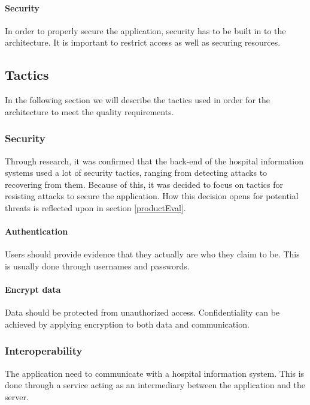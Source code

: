 \paragraph*{Security}
In order to properly secure the application, security has to be built in to the architecture. It is important to restrict access as well as securing resources.



\newpage

\subsection{Tactics}
In the following section we will describe the tactics used in order for the architecture to meet the quality requirements.

\subsubsection{Security}
\label{architecturesecurity}
Through research, it was confirmed that the back-end of the hospital information systems used a lot of security tactics, ranging from detecting attacks to recovering from them. Because of this, it was decided to focus on tactics for resisting attacks to secure the application. How this decision opens for potential threats is reflected upon in section \ref{productEval}.

\paragraph*{Authentication}
Users should provide evidence that they actually are who they claim to be. This is usually done through usernames and passwords.

\paragraph*{Encrypt data}
Data should be protected from unauthorized access. Confidentiality can be achieved by applying encryption to both data and communication.

\subsubsection{Interoperability}
The application need to communicate with a hospital information system. This is done through a service acting as an intermediary between the application and the server.

